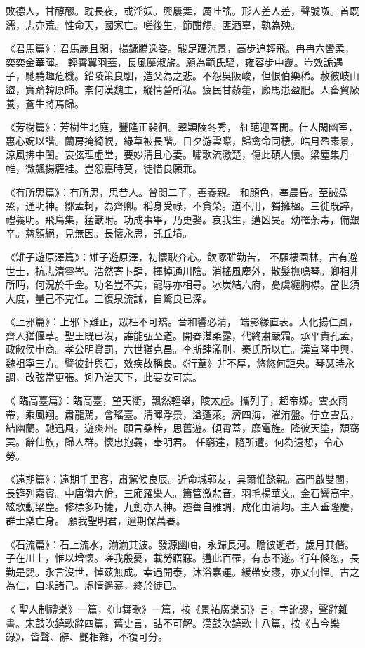 \begin{pinyinscope}
 敗德人，甘醇醪。耽長夜，或淫妖。興屢舞，厲哇謠。形人差人差，聲號呶。首既濡，志亦荒。性命天，國家亡。嗟後生，節酣觴。匪酒辜，孰為殃。



 《君馬篇》：君馬麗且閑，揚鑣騰逸姿。駿足躡流景，高步追輕飛。冉冉六轡柔，奕奕金華暉。
 輕霄翼羽蓋，長風靡淑旂。願為範氏驅，雍容步中畿。豈效詭遇子，馳騁趣危機。鉛陵策良駟，造父為之悲。不怨吳阪峻，但恨伯樂稀。赦彼岐山盜，實躋韓原師。柰何漢魏主，縱情營所私。疲民甘藜藿，廄馬患盈肥。人畜貿厥養，蒼生將焉歸。



 《芳樹篇》：芳樹生北庭，豐隆正裴徊。翠穎陵冬秀，
 紅葩迎春開。佳人閑幽室，惠心婉以諧。蘭房掩綺幌，綠草被長階。日夕游雲際，歸禽命同棲。皓月盈素景，涼風拂中閨。哀弦理虛堂，要妙清且心妻。嘯歌流激楚，傷此碩人懷。梁塵集丹帷，微飆揚羅袿。豈怨嘉時莫，徒惜良願乖。



 《有所思篇》：有所思，思昔人。曾閔二子，善養親。
 和顏色，奉晨昏。至誠烝烝，通明神。鄒孟軻，為齊卿。稱身受祿，不貪榮。道不用，獨擁楹。三徙既誶，禮義明。飛鳥集，猛獸附。功成事畢，乃更娶。哀我生，遘凶旻。幼罹荼毒，備艱辛。慈顏絕，見無因。長懷永思，託丘墳。



 《雉子遊原澤篇》：雉子遊原澤，初懷耿介心。飲啄雖勤苦，
 不願棲園林，古有避世士，抗志清霄岑。浩然寄卜肆，揮棹通川陰。消搖風塵外，散髮撫鳴琴。卿相非所眄，何況於千金。功名豈不美，寵辱亦相尋。冰炭結六府，憂虞纏胸襟。當世須大度，量己不克任。三復泉流誡，自驚良已深。



 《上邪篇》：上邪下難正，眾枉不可矯。音和響必清，
 端影緣直表。大化揚仁風，齊人猶偃草。聖王既已沒，誰能弘至道。開春湛柔露，代終肅嚴霜。承平貴孔孟，政敝侯申商。孝公明賞罰，六世猶克昌。李斯肆濫刑，秦氏所以亡。漢宣隆中興，魏祖寧三方。譬彼針與石，效疾故稱良。《行葦》非不厚，悠悠何詎央。琴瑟時永調，改弦當更張。矧乃治天下，此要安可忘。



 《
 臨高臺篇》：臨高臺，望天衢，飄然輕舉，陵太虛。攜列子，超帝鄉。雲衣雨帶，乘風翔。肅龍駕，會瑤臺。清暉浮景，溢蓬萊。濟四海，濯洧盤。佇立雲岳，結幽蘭。馳迅風，遊炎州。願言桑梓，思舊遊。傾霄蓋，靡電旌。降彼天塗，頹窈冥。辭仙族，歸人群。懷忠抱義，奉明君。
 任窮達，隨所遭。何為遠想，令心勞。



 《遠期篇》：遠期千里客，肅駕候良辰。近命城郭友，具爾惟懿親。高門啟雙闈，長筵列嘉賓。中唐儛六佾，三廂羅樂人。簫管激悲音，羽毛揚華文。金石響高宇，絃歌動梁塵。修標多巧捷，九劍亦入神。遷善自雅調，成化由清均。主人垂隆慶，群士樂亡身。
 願我聖明君，邇期保萬春。



 《石流篇》：石上流水，湔湔其波。發源幽岫，永歸長河。瞻彼逝者，歲月其偕。子在川上，惟以增懷。嗟我殷憂，載勞寤寐。遘此百罹，有志不遂。行年倏忽，長勤是嬰。永言沒世，悼茲無成。幸遇開泰，沐浴嘉運。緩帶安寢，亦又何慍。古之為仁，自求諸己。虛情遙慕，終於徒已。



 《
 聖人制禮樂》一篇，《巾舞歌》一篇，按《景祐廣樂記》言，字訛謬，聲辭雜書。宋鼓吹鐃歌辭四篇，舊史言，詁不可解。漢鼓吹鐃歌十八篇，按《古今樂錄》，皆聲、辭、艷相雜，不復可分。



\end{pinyinscope}